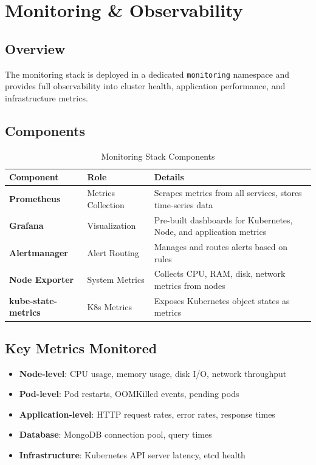 \documentclass[12pt,a4paper]{report}
\begin{document}
\chapter{Monitoring \& Observability}

\section{Overview}

The monitoring stack is deployed in a dedicated \texttt{monitoring} namespace and provides full observability into cluster health, application performance, and infrastructure metrics.

\section{Components}

\begin{table}[H]
  \centering
  \begin{tabular}{>{\bfseries}p{3.5cm} p{4cm} p{6cm}}
    \toprule
    \textbf{Component} & \textbf{Role} & \textbf{Details} \\
    \midrule
    Prometheus & Metrics Collection & Scrapes metrics from all services, stores time-series data \\
    Grafana & Visualization & Pre-built dashboards for Kubernetes, Node, and application metrics \\
    Alertmanager & Alert Routing & Manages and routes alerts based on rules \\
    Node Exporter & System Metrics & Collects CPU, RAM, disk, network metrics from nodes \\
    kube-state-metrics & K8s Metrics & Exposes Kubernetes object states as metrics \\
    \bottomrule
  \end{tabular}
  \caption{Monitoring Stack Components}
\end{table}

\section{Key Metrics Monitored}

\begin{itemize}
  \item \textbf{Node-level}: CPU usage, memory usage, disk I/O, network throughput
  \item \textbf{Pod-level}: Pod restarts, OOMKilled events, pending pods
  \item \textbf{Application-level}: HTTP request rates, error rates, response times
  \item \textbf{Database}: MongoDB connection pool, query times
  \item \textbf{Infrastructure}: Kubernetes API server latency, etcd health
\end{itemize}
\end{document}
